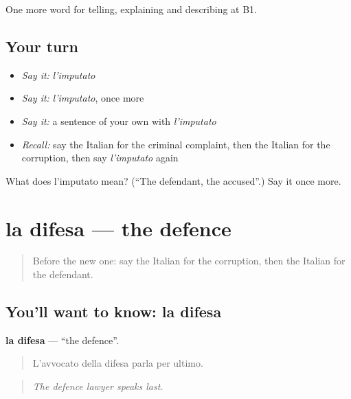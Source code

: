 \begin{grammarlens}[title={What you've built}]
One more word for telling, explaining and describing at B1.
\end{grammarlens}

\subsection*{Your turn}
\begin{itemize}
\raggedright
  \item \emph{Say it:} \emph{l'imputato}
  \item \emph{Say it:} \emph{l'imputato}, once more
  \item \emph{Say it:} a sentence of your own with \emph{l'imputato}
  \item \emph{Recall:} say the Italian for the criminal complaint, then the Italian for the corruption, then say \emph{l'imputato} again
\end{itemize}

\begin{tcolorbox}[breakable,colback=teal!4,colframe=teal!35!black,title={Before you move on}]
What does l'imputato mean? (\textquotedblleft{}The defendant, the accused\textquotedblright{}.) Say it once more.
\end{tcolorbox}
\section[la difesa]{la difesa — the defence}

\label{lesson:IT-C392-difesa}



\begin{quote}
Before the new one: say the Italian for the corruption, then the Italian for the defendant.
\end{quote}

\subsection*{You'll want to know: la difesa}
\textbf{la difesa} — \textquotedblleft{}the defence\textquotedblright{}.

\begin{quote}
L'avvocato della difesa parla per ultimo.
\end{quote}

\begin{quote}
\emph{The defence lawyer speaks last.}
\end{quote}

